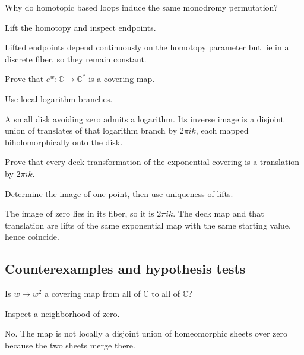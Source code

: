 \begin{exercise}\label{exr:iv23-expand-07}
Why do homotopic based loops induce the same monodromy permutation?
\end{exercise}
\begin{hint}
Lift the homotopy and inspect endpoints.
\end{hint}
\begin{solution}
Lifted endpoints depend continuously on the homotopy parameter but lie in a discrete fiber, so they remain constant.
\end{solution}

\begin{exercise}\label{exr:iv23-expand-08}
Prove that \(e^w:\mathbb C\to\mathbb C^*\) is a covering map.
\end{exercise}
\begin{hint}
Use local logarithm branches.
\end{hint}
\begin{solution}
A small disk avoiding zero admits a logarithm. Its inverse image is a disjoint union of translates of that logarithm branch by \(2\pi i k\), each mapped biholomorphically onto the disk.
\end{solution}

\begin{exercise}\label{exr:iv23-expand-09}
Prove that every deck transformation of the exponential covering is a translation by \(2\pi i k\).
\end{exercise}
\begin{hint}
Determine the image of one point, then use uniqueness of lifts.
\end{hint}
\begin{solution}
The image of zero lies in its fiber, so it is \(2\pi i k\). The deck map and that translation are lifts of the same exponential map with the same starting value, hence coincide.
\end{solution}

\subsection*{Counterexamples and hypothesis tests}

\begin{exercise}\label{exr:iv23-expand-10}
Is \(w\mapsto w^2\) a covering map from all of \(\mathbb C\) to all of \(\mathbb C\)?
\end{exercise}
\begin{hint}
Inspect a neighborhood of zero.
\end{hint}
\begin{solution}
No. The map is not locally a disjoint union of homeomorphic sheets over zero because the two sheets merge there.
\end{solution}

